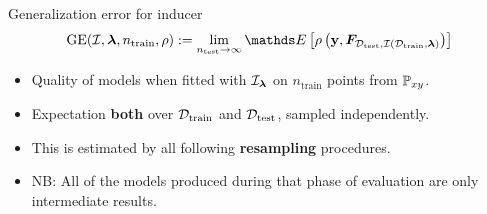 \documentclass[11pt,compress,t,notes=noshow, xcolor=table]{beamer}
\begin{document}






\begin{vbframe}{Generalization error for inducer}
  $$\GEfull := 
  \lim_{\ntest \rightarrow \infty} \E \left[ \rho \left(
  \yv, \F_{\Dtest, \ind(\D_{\mathrm{train}}, \lamv)} 
  \right)\right]$$

\begin{itemize}
  \item Quality of models when fitted with $\mathcal{I}_{\bm{\lambda}}$ on 
      $n_{\mathrm{train}}$ points from $\mathbb{P}_{xy}$.
  \item Expectation \textbf{both} over $\mathcal{D}_{\text{train}}$ and $\mathcal{D}_{\text{test}}$, sampled independently.
  \item This is estimated by all following \textbf{resampling} procedures. 
  \item NB: All of the models produced during that phase of evaluation are only
    intermediate results.
\end{itemize}
\end{vbframe}
\end{document}
